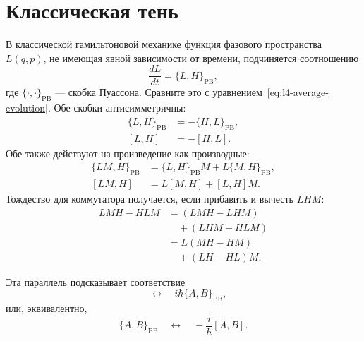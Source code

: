 \begin{classroomqa}
\end{classroomqa}

\section{Классическая тень}

В классической гамильтоновой механике функция фазового пространства \(L(q,p)\), не имеющая явной зависимости от времени, подчиняется соотношению
\begin{equation}
\frac{dL}{dt}=\{L,H\}_{\mathrm{PB}},
\label{eq:l4-poisson-evolution}
\end{equation}
где \(\{\cdot,\cdot\}_{\mathrm{PB}}\) — скобка Пуассона. Сравните это с уравнением~\eqref{eq:l4-average-evolution}. Обе скобки антисимметричны:
\begin{align}
\{L,H\}_{\mathrm{PB}}&=-\{H,L\}_{\mathrm{PB}},\\
[L,H]&=-[H,L].
\end{align}
Обе также действуют на произведение как производные:
\begin{align}
\{LM,H\}_{\mathrm{PB}}
&=\{L,H\}_{\mathrm{PB}}M+L\{M,H\}_{\mathrm{PB}},\\
[LM,H]
&=L[M,H]+[L,H]M.
\label{eq:l4-commutator-product}
\end{align}
Тождество для коммутатора получается, если прибавить и вычесть \(LHM\):
\begin{align}
LMH-HLM
&=(LMH-LHM)\\
&\quad +(LHM-HLM)\\
&=L(MH-HM)\\
&\quad +(LH-HL)M.
\end{align}

Эта параллель подсказывает соответствие
\begin{equation}
[A,B]
\quad\longleftrightarrow\quad
i\hbar\{A,B\}_{\mathrm{PB}},
\label{eq:l4-dirac-correspondence}
\end{equation}
или, эквивалентно,
\begin{equation}
\{A,B\}_{\mathrm{PB}}
\quad\longleftrightarrow\quad
-\frac{i}{\hbar}[A,B].
\end{equation}

